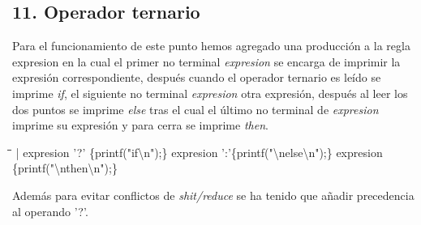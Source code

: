 \documentclass[11pt,spanish]{article}
\begin{document}
		\subsection*{11. Operador ternario}
		Para el funcionamiento de este punto hemos agregado una producción a la regla {\ttfamily expresion} en la cual el primer no terminal \textit {expresion} se encarga de imprimir la expresión correspondiente, después cuando el operador ternario es leído se imprime \textit {if}, el siguiente no terminal \textit {expresion} otra expresión, después al leer los dos puntos se imprime \textit {else} tras el cual el último no terminal de \textit {expresion} imprime su expresión y para cerra se imprime \textit {then}.
		\begin{tabbing}
            \hspace*{1cm}\=\hspace*{1cm}\= \hspace*{6cm}\=\kill
			| expresion '?' \{printf("if\textbackslash n");\} expresion ':'\{printf("\textbackslash nelse\textbackslash n");\} expresion \{printf("\textbackslash nthen\textbackslash n");\}
			
		\end{tabbing}
		Además para evitar conflictos de \textit {shit/reduce} se ha tenido que añadir precedencia al operando '?'.
\end{document}

